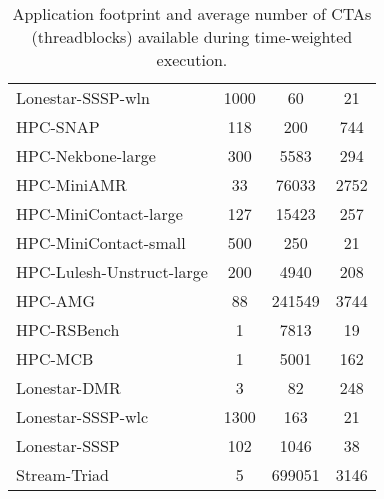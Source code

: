 \begin{table}[t]
\begin{small}
\begin{tabular}{lccc}
Lonestar-SSSP-wln & 1000 & 60 & 21 \\
HPC-SNAP & 118 & 200 & 744 \\
HPC-Nekbone-large & 300 & 5583 & 294 \\
HPC-MiniAMR & 33 & 76033 & 2752 \\
HPC-MiniContact-large & 127 & 15423 & 257 \\
HPC-MiniContact-small & 500 & 250 & 21 \\
HPC-Lulesh-Unstruct-large & 200 & 4940 & 208 \\
HPC-AMG & 88 & 241549 & 3744 \\
HPC-RSBench & 1 & 7813 & 19 \\
HPC-MCB & 1 & 5001 & 162 \\
Lonestar-DMR & 3 & 82 & 248 \\
Lonestar-SSSP-wlc & 1300 & 163 & 21 \\
Lonestar-SSSP & 102 & 1046 & 38 \\
Stream-Triad & 5 & 699051 & 3146 \\
\toprule
\end{tabular}
\caption{Application footprint and average number of CTAs (threadblocks) available during time-weighted execution.}
\label{tab:numctas}
\end{small}
\end{table}